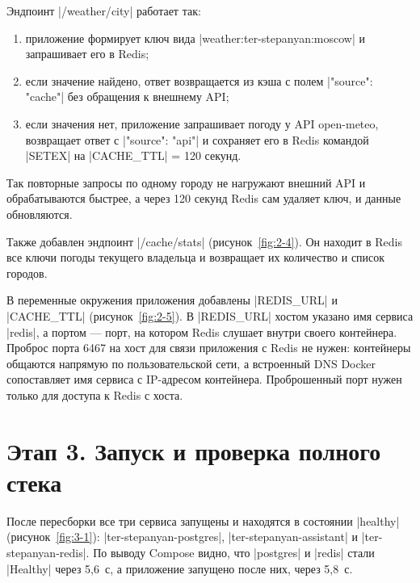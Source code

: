 
Эндпоинт \cmd|/weather/{city}| работает так:
\begin{enumerate}
  \item приложение формирует ключ вида
        \cmd|weather:ter-stepanyan:moscow| и запрашивает его в Redis;
  \item если значение найдено, ответ возвращается из кэша с полем
        \cmd|"source": "cache"| без обращения к внешнему API;
  \item если значения нет, приложение запрашивает погоду у API
        open-meteo, возвращает ответ с \cmd|"source": "api"| и
        сохраняет его в Redis командой \cmd|SETEX| на
        \cmd|CACHE_TTL| = 120 секунд.
\end{enumerate}

Так повторные запросы по одному городу не нагружают внешний API и
обрабатываются быстрее, а через 120 секунд Redis сам удаляет ключ, и
данные обновляются.

Также добавлен эндпоинт \cmd|/cache/stats| (рисунок~\ref{fig:2-4}). Он
находит в Redis все ключи погоды текущего владельца и возвращает их
количество и список городов.


В переменные окружения приложения добавлены \cmd|REDIS_URL| и
\cmd|CACHE_TTL| (рисунок~\ref{fig:2-5}). В \cmd|REDIS_URL| хостом
указано имя сервиса \cmd|redis|, а портом --- порт, на котором Redis
слушает внутри своего контейнера. Проброс порта 6467 на хост для связи
приложения с Redis не нужен: контейнеры общаются напрямую по
пользовательской сети, а встроенный DNS Docker сопоставляет имя сервиса
с IP-адресом контейнера. Проброшенный порт нужен только для доступа к
Redis с хоста.


\section{Этап 3. Запуск и проверка полного стека}

После пересборки все три сервиса запущены и находятся в состоянии
\cmd|healthy| (рисунок~\ref{fig:3-1}): \cmd|ter-stepanyan-postgres|,
\cmd|ter-stepanyan-assistant| и \cmd|ter-stepanyan-redis|. По
выводу Compose видно, что \cmd|postgres| и \cmd|redis| стали
\cmd|Healthy| через 5,6~с, а приложение запущено после них, через
5,8~с.

